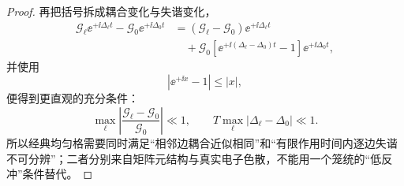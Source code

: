 \begin{proof}
再把括号拆成耦合变化与失谐变化，
\begin{align*}
\mathcal G_\ell\ee^{+\ii\Delta_\ell t}
-\mathcal G_0\ee^{+\ii\Delta_0t}
&=
(\mathcal G_\ell-\mathcal G_0)\ee^{+\ii\Delta_\ell t}\\
&\quad+
\mathcal G_0
\left[
\ee^{+\ii(\Delta_\ell-\Delta_0)t}-1
\right]
\ee^{+\ii\Delta_0t},
\end{align*}
并使用
\[
|\ee^{+\ii x}-1|
\le|x|,
\]
便得到更直观的充分条件：
\[
\max_\ell
\left|
\frac{\mathcal G_\ell-\mathcal G_0}{\mathcal G_0}
\right|
\ll1,
\qquad
T\max_\ell|\Delta_\ell-\Delta_0|
\ll1.
\]
所以经典均匀格需要同时满足“相邻边耦合近似相同”和“有限作用时间内逐边失谐不可分辨”；二者分别来自矩阵元结构与真实电子色散，不能用一个笼统的“低反冲”条件替代。
\end{proof}


